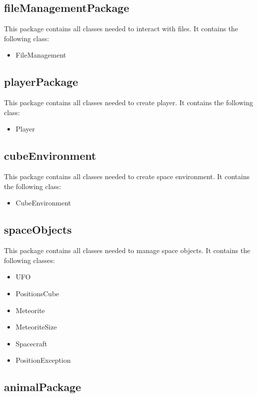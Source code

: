 \subsection{fileManagementPackage}

This package contains all classes needed to interact with files. It contains the following class:
\begin{itemize}
 \item FileManagement
\end{itemize}

\subsection{playerPackage}

This package contains all classes needed to create player. It contains the following class:
\begin{itemize}
 \item Player
\end{itemize}

\subsection{cubeEnvironment}

This package contains all classes needed to create space environment. It contains the following class:
\begin{itemize}
 \item CubeEnvironment
\end{itemize}

\subsection{spaceObjects}

This package contains all classes needed to manage space objects. It contains the following classes:
\begin{itemize}
 \item UFO
 \item PositionsCube
 \item Meteorite
 \item MeteoriteSize
 \item Spacecraft
 \item PositionException
\end{itemize}

\subsection{animalPackage}

